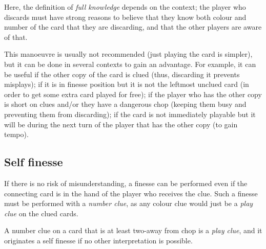 Here, the definition of \emph{full knowledge} depends on the context; the player who discards must have strong reasons to believe that they know both colour and number of the card that they are discarding, and that the other players are aware of that.

This manoeuvre is usually not recommended (just playing the card is simpler), but it can be done in several contexts to gain an advantage. For example, it can be useful if the other copy of the card is clued (thus, discarding it prevents misplays); if it is in finesse position but it is not the leftmost unclued card (in order to get some extra card played for free); if the player who has the other copy is short on clues and/or they have a dangerous chop (keeping them busy and preventing them from discarding); if the card is not immediately playable but it will be during the next turn of the player that has the other copy (to gain tempo).

\subsection{Self finesse}

If there is no risk of misunderstanding, a finesse can be performed even if the connecting card is in the hand of the player who receives the clue. Such a finesse must be performed with a \emph{number clue}, as any colour clue would just be a \emph{play clue} on the clued cards.

\begin{convention}
	A number clue on a card that is at least two-away from chop is a \emph{play clue}, and it originates a self finesse if no other interpretation is possible.
\end{convention}

